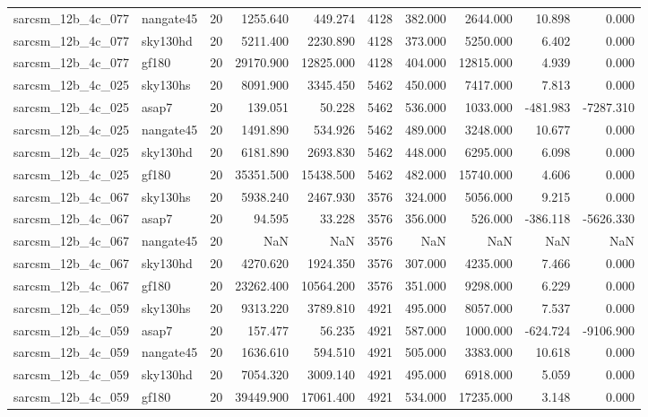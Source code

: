 \begin{tabular}{llrrrrrrrr}
sarcsm\_12b\_4c\_077 & nangate45 & 20 & 1255.640 & 449.274 & 4128 & 382.000 & 2644.000 & 10.898 & 0.000 \\
sarcsm\_12b\_4c\_077 & sky130hd & 20 & 5211.400 & 2230.890 & 4128 & 373.000 & 5250.000 & 6.402 & 0.000 \\
sarcsm\_12b\_4c\_077 & gf180 & 20 & 29170.900 & 12825.000 & 4128 & 404.000 & 12815.000 & 4.939 & 0.000 \\
sarcsm\_12b\_4c\_025 & sky130hs & 20 & 8091.900 & 3345.450 & 5462 & 450.000 & 7417.000 & 7.813 & 0.000 \\
sarcsm\_12b\_4c\_025 & asap7 & 20 & 139.051 & 50.228 & 5462 & 536.000 & 1033.000 & -481.983 & -7287.310 \\
sarcsm\_12b\_4c\_025 & nangate45 & 20 & 1491.890 & 534.926 & 5462 & 489.000 & 3248.000 & 10.677 & 0.000 \\
sarcsm\_12b\_4c\_025 & sky130hd & 20 & 6181.890 & 2693.830 & 5462 & 448.000 & 6295.000 & 6.098 & 0.000 \\
sarcsm\_12b\_4c\_025 & gf180 & 20 & 35351.500 & 15438.500 & 5462 & 482.000 & 15740.000 & 4.606 & 0.000 \\
sarcsm\_12b\_4c\_067 & sky130hs & 20 & 5938.240 & 2467.930 & 3576 & 324.000 & 5056.000 & 9.215 & 0.000 \\
sarcsm\_12b\_4c\_067 & asap7 & 20 & 94.595 & 33.228 & 3576 & 356.000 & 526.000 & -386.118 & -5626.330 \\
sarcsm\_12b\_4c\_067 & nangate45 & 20 & NaN & NaN & 3576 & NaN & NaN & NaN & NaN \\
sarcsm\_12b\_4c\_067 & sky130hd & 20 & 4270.620 & 1924.350 & 3576 & 307.000 & 4235.000 & 7.466 & 0.000 \\
sarcsm\_12b\_4c\_067 & gf180 & 20 & 23262.400 & 10564.200 & 3576 & 351.000 & 9298.000 & 6.229 & 0.000 \\
sarcsm\_12b\_4c\_059 & sky130hs & 20 & 9313.220 & 3789.810 & 4921 & 495.000 & 8057.000 & 7.537 & 0.000 \\
sarcsm\_12b\_4c\_059 & asap7 & 20 & 157.477 & 56.235 & 4921 & 587.000 & 1000.000 & -624.724 & -9106.900 \\
sarcsm\_12b\_4c\_059 & nangate45 & 20 & 1636.610 & 594.510 & 4921 & 505.000 & 3383.000 & 10.618 & 0.000 \\
sarcsm\_12b\_4c\_059 & sky130hd & 20 & 7054.320 & 3009.140 & 4921 & 495.000 & 6918.000 & 5.059 & 0.000 \\
sarcsm\_12b\_4c\_059 & gf180 & 20 & 39449.900 & 17061.400 & 4921 & 534.000 & 17235.000 & 3.148 & 0.000 \\

\end{tabular}
